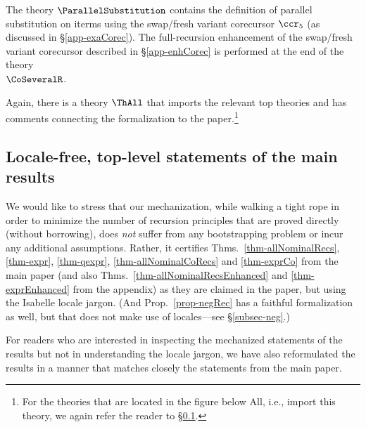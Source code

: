 The theory $\ParallelSubstitution$ contains the definition of parallel substitution on iterms using the swap/fresh variant corecursor $\ccr_5$ (as discussed in \S\ref{app-exaCorec}). The full-recursion enhancement of the swap/fresh variant corecursor described in \S\ref{app-enhCorec} is performed at the end of the theory \\$\CoSeveralR$. 

Again, there is a theory $\ThAll$ that imports the relevant top theories and has comments connecting the formalization to the paper.\footnote{For the theories that are located in the figure below \textsf{All}, i.e., import  this theory, we again refer the reader to  \S\ref{app-subsec-localeFree}.}




\subsection{Locale-free, top-level statements of the main results}
\label{app-subsec-localeFree}



We would like to stress that our mechanization, while walking a tight rope in order to minimize the number of recursion principles that are proved  directly (without borrowing), does \emph{not} suffer from any bootstrapping problem or incur any additional assumptions. Rather, it certifies 
Thms.~\ref{thm-allNominalRecs}, \ref{thm-expr}, \ref{thm-qexpr}, 
\ref{thm-allNominalCoRecs} and \ref{thm-exprCo} from the main paper (and also Thms.~\ref{thm-allNominalRecsEnhanced} and \ref{thm-exprEnhanced} from the appendix) 
as they are claimed in the paper, but %
using the Isabelle locale jargon. (And Prop.~\ref{prop-negRec} has a faithful formalization as well, but that does not make use of locales---see \S\ref{subsec-neg}.) 

For readers who are interested in inspecting the mechanized statements of the results but not in understanding the locale jargon, we have also reformulated the results in a manner that matches closely the statements from the main paper. 

